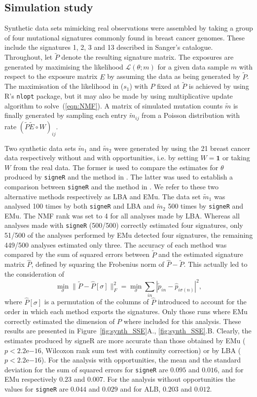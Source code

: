 \documentclass{bioinfo}
\begin{document}
\subsection{Simulation study}
Synthetic data sets mimicking real observations were assembled by
taking a group of four mutational signatures commonly found in breast
cancer genomes. These include the signatures 1, 2, 3 and 13 described
in Sanger's catalogue. Throughout, let $\widetilde P$ denote the
resulting signature matrix.  The exposures are generated by maximising
the likelihood $\mathcal L(\theta; m)$ for a given data sample $m$
with respect to the exposure matrix $E$ by assuming the data as being
generated by $\widetilde P$. The maximisation of the likelihood in
($s_1$) with $P$ fixed at $\widetilde P$ is achieved by using R's
\texttt{nlopt} package, but it may also be made by using
\cite{LS} multiplicative update algorithm to solve~(\ref{eqn:NMF}). A
matrix of simulated mutation counts $\widetilde m$ is finally
generated by sampling each entry $\widetilde m_{ij}$ from a Poisson
distribution with rate $(\widetilde P\widetilde E\circ W)_{ij}$.

Two synthetic data sets $\widetilde m_1$ and $\widetilde m_2$ were
generated by using the 21 breast cancer data respectively without and
with opportunities, i.e. by setting $W=\mathbf{1}$  or taking $W$
from the real data. The former is used to compare the estimates for
 $\theta$ produced by
\texttt{signeR} and the method in \cite{A}. The latter was used to
establish a comparison between \texttt{signeR} and the method in
\cite{FICMV}. We refer to these two alternative methods respectively
as LBA and EMu. The data set $\widetilde m_1$ was analysed 100 times
by both \texttt{signeR} and LBA and $\widetilde m_2$ 500 times by
\texttt{signeR} and EMu. The NMF rank was set to 4 for all analyses
made by LBA. Whereas all analyses made with \texttt{signeR} (500/500)
correctly estimated four signatures, only 51/500 of the analyses
performed by EMu detected four signatures, the remaining 449/500
analyses estimated only three. The accuracy of each method was
compared by the sum of squared errors between $\widetilde P$ and the
estimated signature matrix $\widehat P$, defined by squaring the
Frobenius norm of $\widehat P - \widetilde P$. This actually led to
the consideration of
\[
   \min_\sigma
   \big\|\widetilde P - \widehat P[\sigma]\big\|_F^2
  =
   \min_\sigma \sum_{in}
     |\widetilde p_{in} - \widehat p_{i \sigma(n)}|^2,
\]
where $\widehat P[\sigma]$ is a permutation of the columns of
$\widehat P$ introduced to account for the order in which each method
exports the signatures. Only those runs where EMu correctly estimated
the dimension of $P$ where included for this analysis. These results
are presented in Figure~\ref{fig:synth_SSE}A., \ref{fig:synth_SSE}.B.
Clearly, the estimates produced by signeR are more accurate than those
obtained by EMu ($p < 2.2$e$-16$, Wilcoxon rank sum test with
continuity correction) or by LBA ($p < 2.2$e$-16$). For the analysis
with opportunities, the mean and the standard deviation for the sum of
squared errors for \texttt{signeR} are $0.095$ and $0.016$, and for
EMu respectively $0.23$ and $0.007$. For the analysis without
opportunities the values for \texttt{signeR} are $0.044$ and $0.029$
and for ALB, $0.203$ and $0.012$.
\end{document}
